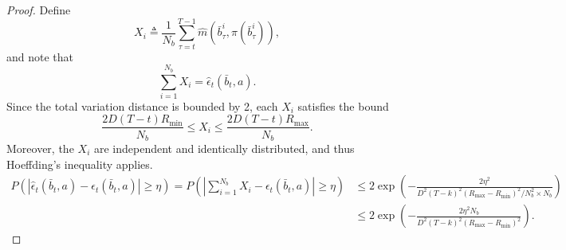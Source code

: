 \documentclass[acmlarge, manuscript, screen, review, natbib=false, oneside]{acmart}
\begin{document}
\begin{proof}
	Define
	\begin{equation}
		X_i \triangleq \frac{1}{N_b} \sum_{\tau=t}^{T-1} \hat{m}(\bar{b}_\tau^i, \pi(\bar{b}_\tau^i)),
	\end{equation}
	and note that
	\begin{equation}
		\sum_{i=1}^{N_b} X_i = \hat{\epsilon}_t(\bar{b}_t, a).
	\end{equation}
	Since the total variation distance is bounded by 2, each $X_i$ satisfies the bound
	\begin{equation}
		\frac{2D(T - t) R_{\min}}{N_b} \leq X_i \leq \frac{2D(T - t) R_{\max}}{N_b}.
	\end{equation}
	Moreover, the $X_i$ are independent and identically distributed, and thus Hoeffding’s inequality applies.
	\begin{equation}
		\begin{aligned}
			P(|\hat{\epsilon}_t(\bar{b}_t, a)-\epsilon_t(\bar{b}_t, a)|\geq \eta)
			=P(|\sum_{i=1}^{N_b}X_i-\epsilon_t(\bar{b}_t, a)|\geq \eta)
			&\leq 2\exp(-\frac{2\eta^2}{D^2(T-k)^2(R_{\max}-R_{\min})^2 / N_b^2 \times N_b}) \\
			&\leq 2\exp(-\frac{2\eta^2 N_b}{D^2(T-k)^2(R_{\max}-R_{\min})^2}).
		\end{aligned}
	\end{equation}
\end{proof}
\end{document}
